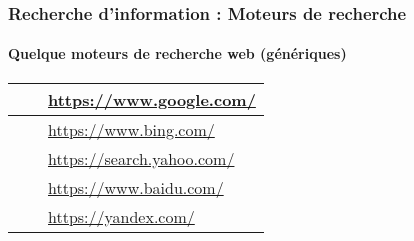 \documentclass[xcolor=table]{beamer}
\begin{document}
\begin{frame}
\frametitle{Recherche d'information : Moteurs de recherche}
\framesubtitle{Quelque moteurs de recherche web (génériques)}

\def\arraystretch{0}

\begin{tabular}{L{.3\textwidth}{.8cm}cp{.6\textwidth}}%
	
	\hline
	
	 &
	& 
	\url{https://www.google.com/}  \\
	
	\hline
	
	 &
	& 
	\url{https://www.bing.com/} \\
	
	\hline
	
	 & 
	& 
	\url{https://search.yahoo.com/} \\
	
	\hline
	
	 & 
	& 
	\url{https://www.baidu.com/} \\
	
	\hline
	
	 & 
	& 
	\url{https://yandex.com/} \\
	
	\hline
	
\end{tabular}

\end{frame}
\end{document}
